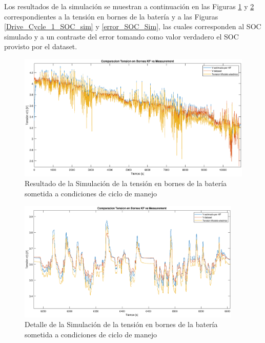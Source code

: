 \documentclass[10pt,a4paper]{article}
\begin{document}
Los resultados de la simulación se muestran a continuación en las Figuras
\ref{Tension_sim} y \ref{Tension_sim_zoom} correspondientes a la tensión en
bornes de la batería y  a las Figuras \ref{Drive_Cycle_1_SOC_sim} y
\ref{error_SOC_Sim}, las cuales corresponden al SOC simulado y a un contraste
del error tomando como valor verdadero el SOC provisto por el dataset.

\begin{figure}[h!]
    \begin{center}
	\includegraphics[width=1\textwidth]{Tension_Sim.eps}
	\caption{Resultado de la Simulación de la tensión en bornes de la 
	batería sometida a condiciones de ciclo de manejo}
	\label{Tension_sim}
    \end{center}
\end{figure}

\begin{figure}[h!]
    \begin{center}
	\includegraphics[width=0.95\textwidth]{Tension_Sim_zoom.eps}
	\caption{Detalle de la Simulación de la tensión en bornes de la batería
	sometida a condiciones de ciclo de manejo}
	\label{Tension_sim_zoom}
    \end{center}
\end{figure}
\end{document}
